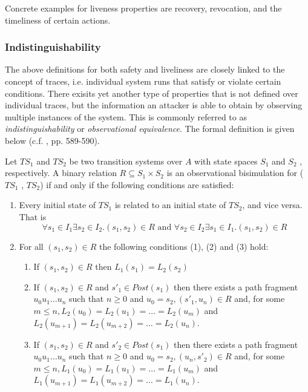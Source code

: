 Concrete examples for liveness properties are recovery, revocation, and the timeliness of certain actions.

\subsubsection{Indistinguishability}

The above definitions for both safety and liveliness are closely linked to the concept of traces, i.e. individual system runs that satisfy or violate certain conditions.
There exisits yet another type of properties that is not defined over individual traces, but the information an attacker is able to obtain by observing multiple instances of the system.
This is commonly referred to as \textit{indistinguishability} or \textit{observational equivalence}.
The formal definition is given below (c.f. \cite{baier2008principles}, pp. 589-590).

Let $TS_1$ and $TS_2$ be two transition systems over $A$ with state spaces $S_1$ and $S_2$ , respectively.
A binary relation $R \subseteq S_1 \times S_2$ is an
observational bisimulation for ($TS_1$ , $TS_2$) if and only if the following conditions are satisfied:

\begin{enumerate}[label=(\Alph*)]
    \item Every initial state of $TS_1$ is related to an initial state of $TS_2$, and vice versa. That is
    \begin{equation*}
        \forall s_1 \in I_1 \exists s_2 \in I_2. (s_1, s_2) \in R \text{ and } \forall s_2 \in I_2 \exists s_1 \in I_1. (s_1, s_2) \in R
    \end{equation*}
    \item For all $(s_1, s_2) \in R$ the following conditions (1), (2) and (3) hold:
    \begin{enumerate}[label=(\arabic*)]
        \item If $(s_1, s_2) \in R$ then $L_1 (s_1) = L_2 (s_2)$
        \item If $(s_1, s_2) \in R$ and $s'_1 \in Post(s_1)$ then there exists a path fragment $u_0 u_1 \ldots u_n$ such that $n \geq 0$ and $u_0 = s_2, (s'_1, u_n) \in R$ and, for some $m \leq n, L_2(u_0) = L_2(u_1) = \ldots = L_2(u_m)$ and $L_2(u_{m+1}) = L_2(u_{m+2}) = \ldots = L_2(u_n)$.
        \item If $(s_1, s_2) \in R$ and $s'_2 \in Post(s_1)$ then there exists a path fragment $u_0 u_1 \ldots u_n$ such that $n \geq 0$ and $u_0 = s_2, (u_n, s'_2) \in R$ and, for some $m \leq n, L_1(u_0) = L_1(u_1) = \ldots = L_1 (u_m )$
and $L_1(u_{m+1}) = L_1(u_{m+2}) = \ldots = L_1 (u_n)$.
    \end{enumerate}
\end{enumerate}

